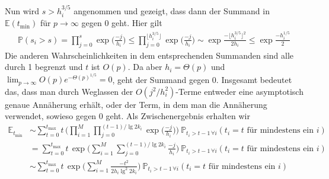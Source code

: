 \documentclass[a4paper, 11pt, ngerman]{article}
\newcommand{\E}{\mathbb{E}}
\renewcommand{\P}{\mathbb{P}}
\begin{document}
Nun wird $s > h_i^{3/5}$ angenommen und gezeigt, dass dann der Summand in $\E(t_{\min})$ für $p \to \infty$ gegen 0 geht. Hier gilt
\begin{align*}
    \P(s_i > s)
    = \prod_{j = 0}^{s} \exp \bigg ( \frac {-j}{h_i} \bigg )
    \le \prod_{j = 0}^{\big \lfloor h_i^{3/5} \big \rfloor}
    \exp \bigg ( \frac {-j}{h_i} \bigg )
    \sim \exp \frac {- \big \lfloor h_i^{3/5} \big \rfloor^2 } {2h_i}
    \le \exp \frac {- h_i^{1/5}} {2}
\end{align*}
Die anderen Wahrscheinlichkeiten in dem entsprechenden Summanden sind alle durch 1 begrenzt und $t$ ist $O(p)$. Da aber $h_i = \Theta(p)$ und $\lim_{p \to \infty} O(p) e^{-\Theta(p)^{1/5}} = 0$, geht der Summand gegen 0. Insgesamt bedeutet das, dass man durch Weglassen der $O(j^2/h_i^2)$-Terme entweder eine asymptotisch genaue Annäherung erhält, oder der Term, in dem man die Annäherung verwendet, sowieso gegen 0 geht. Als Zwischenergebnis erhalten wir
\begin{align}
    \E_{t_{\min}}
     & \sim \sum_{t = 0}^{t_{\max}} t \,
    \Bigg ( \prod_{i = 1}^M \prod_{j = 0}^{(t-1) / \lg 2k_i}
    \exp \bigg ( \frac {-j}{h_i} \bigg ) \Bigg ) \
    \P_{t_i > t - 1 \, \forall i}(t_i = t \text{ für mindestens ein } i)
    \nonumber                            \\
     & = \sum_{t = 0}^{t_{\max}} t \,
    \exp \Bigg ( \sum_{i = 1}^M \sum_{j = 0}^{(t-1) / \lg 2k_i}
    \frac {-j}{h_i} \Bigg ) \
    \P_{t_i > t - 1 \, \forall i}(t_i = t \text{ für mindestens ein } i)
    \nonumber                            \\
     & \sim \sum_{t = 0}^{t_{\max}} t \,
    \exp \Bigg ( \sum_{i = 1}^M \frac {-t^2} {2 h_i \lg^2 2k_i} \Bigg ) \
    \P_{t_i > t - 1 \, \forall i}(t_i = t \text{ für mindestens ein } i)
    \label{expectation-tmin-intermed}
\end{align}
\end{document}
